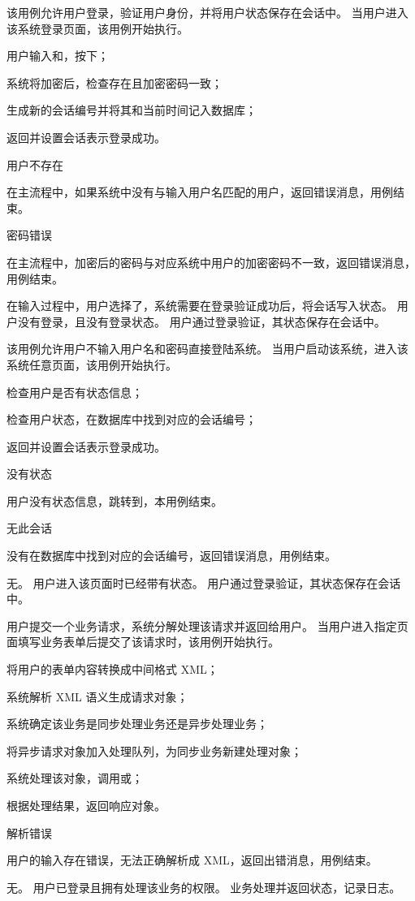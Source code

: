 \documentclass[cs4size,a4paper,nofonts]{ctexart}
\begin{document}
{该用例允许用户登录，验证用户身份，并将用户状态保存在会话中。} %
{当用户进入该系统登录页面，该用例开始执行。} %
{
\item 用户输入和，按下；
\item 系统将加密后，检查存在且加密密码一致；
\item 生成新的会话编号并将其和当前时间记入数据库；
\item 返回并设置会话表示登录成功。
} %
{} %
{
\item 用户不存在\par
在主流程中，如果系统中没有与输入用户名匹配的用户，返回错误消息，用例结束。
\item 密码错误\par
在主流程中，加密后的密码与对应系统中用户的加密密码不一致，返回错误消息，用例结束。
} %
{在输入过程中，用户选择了，系统需要在登录验证成功后，将会话写入状态。} %
{用户没有登录，且没有登录状态。} %
{用户通过登录验证，其状态保存在会话中。} %

{该用例允许用户不输入用户名和密码直接登陆系统。} %
{当用户启动该系统，进入该系统任意页面，该用例开始执行。} %
{
\item 检查用户是否有状态信息；
\item 检查用户状态，在数据库中找到对应的会话编号；
\item 返回并设置会话表示登录成功。
} %
{} %
{
\item 没有状态\par
用户没有状态信息，跳转到，本用例结束。
\item 无此会话\par
没有在数据库中找到对应的会话编号，返回错误消息，用例结束。
} %
{无。} %
{用户进入该页面时已经带有状态。} %
{用户通过登录验证，其状态保存在会话中。} %

{用户提交一个业务请求，系统分解处理该请求并返回给用户。} %
{当用户进入指定页面填写业务表单后提交了该请求时，该用例开始执行。} %
{
\item 将用户的表单内容转换成中间格式 XML；
\item 系统解析 XML 语义生成请求对象；
\item 系统确定该业务是同步处理业务还是异步处理业务；
\item 将异步请求对象加入处理队列，为同步业务新建处理对象；
\item 系统处理该对象，调用或；
\item 根据处理结果，返回响应对象。
} %
{} %
{
\item 解析错误\par
用户的输入存在错误，无法正确解析成 XML，返回出错消息，用例结束。
} %
{无。} %
{用户已登录且拥有处理该业务的权限。} %
{业务处理并返回状态，记录日志。} %
\end{document}
